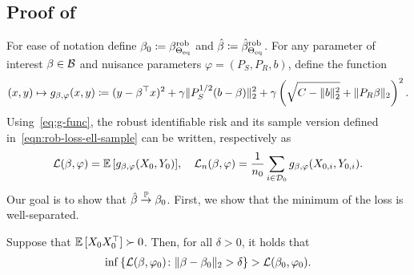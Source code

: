 \subsection{Proof of }

    For ease of notation define $\beta_0 \coloneqq \beta^{\mathrm{rob}}_{\Theta_{\mathrm{eq}}}$ and $\hat{\beta} \coloneqq \hat{\beta}^{\mathrm{rob}}_{\Theta_{\mathrm{eq}}}$.
    For any parameter of interest $\beta \in \mathcal{B}$ and nuisance parameters $\varphi = (P_S, P_R, b)$,
   define the function 
  \begin{align}\label{eq:g-func}
      (x, y) \mapsto g_{\beta,\varphi}(x, y) 
      \coloneqq (y - \beta^\top x)^2 
      + \gamma \|P_S^{1/2}(b - \beta)\|_2^2
      + \gamma \left(\sqrt{C - \|b\|_2^2}  + \|P_R \beta\|_2\right)^2.
  \end{align}
  Using~\eqref{eq:g-func}, the robust identifiable risk and its sample version defined in~\eqref{eqn:rob-loss-ell-sample} can be written, respectively as
  \begin{align*}
      \mathcal{L}(\beta, \varphi) = \mathbb{E}\,[g_{\beta, \varphi}(X_0, Y_0)],
      \quad
      \mathcal{L}_n(\beta, \varphi) = \frac{1}{n_0}\sum_{i \in \mathcal{D}_0} g_{\beta, \varphi}(X_{0,i}, Y_{0,i}).
  \end{align*}
    Our goal is to show that $\hat{\beta} \stackrel{\mathbb{P}}{\to}\beta_0$. First, we show that the minimum of the loss is well-separated.

    \begin{lemma}\label{lm:well-separation}
    Suppose that $\mathbb{E}\,[X_0X_0^\top] \succ 0$.
    Then, for all $\delta > 0$, it holds that
\begin{align}\label{eqn:well-sep}
    \inf\left\{\mathcal{L}(\beta, \varphi_0) \colon \|\beta - \beta_0\|_2 > \delta \right\} > \mathcal{L}(\beta_0, \varphi_0).
\end{align}
\end{lemma}
    
